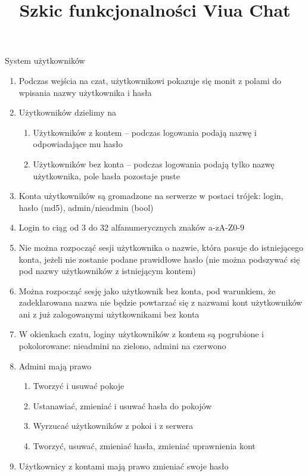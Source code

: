 \documentclass[11pt,oneside,a4paper,onecolumn]{article}
\title{Szkic funkcjonalności Viua Chat}
\begin{document}
\maketitle

System użytkowników
\begin{enumerate}
\item Podczas wejścia na czat, użytkownikowi pokazuje się monit z polami do wpisania nazwy użytkownika i hasła
\item Użytkowników dzielimy na
  \begin{enumerate}
  \item Użytkowników z kontem – podczas logowania podają nazwę i odpowiadające mu hasło
  \item Użytkowników bez konta – podczas logowania podają tylko nazwę użytkownika, pole hasła pozostaje puste
  \end{enumerate}
\item Konta użytkowników są gromadzone na serwerze w postaci trójek: login, hasło (md5), admin/nieadmin (bool)
\item Login to ciąg od 3 do 32 alfanumerycznych znaków a-zA-Z0-9
\item Nie można rozpocząć sesji użytkownika o nazwie, która pasuje do istniejącego konta, jeżeli nie zostanie podane prawidłowe hasło (nie można podszywać się pod nazwy użytkowników z istniejącym kontem)
\item Można rozpocząć sesję jako użytkownik bez konta, pod warunkiem, że zadeklarowana nazwa nie będzie powtarzać się z nazwami kont użytkowników ani z już zalogowanymi użytkownikami bez konta
\item W okienkach czatu, loginy użytkowników z kontem są pogrubione i pokolorowane: nieadmini na zielono, admini na czerwono
\item Admini mają prawo
\begin{enumerate}
\item Tworzyć i usuwać pokoje
\item Ustanawiać, zmieniać i usuwać hasła do pokojów
\item Wyrzucać użytkowników z pokoi i z serwera
\item Tworzyć, usuwać, zmieniać hasła, zmieniać uprawnienia kont
\end{enumerate}
\item Użytkownicy z kontami mają prawo zmieniać swoje hasło
\end{enumerate}
\end{document}
